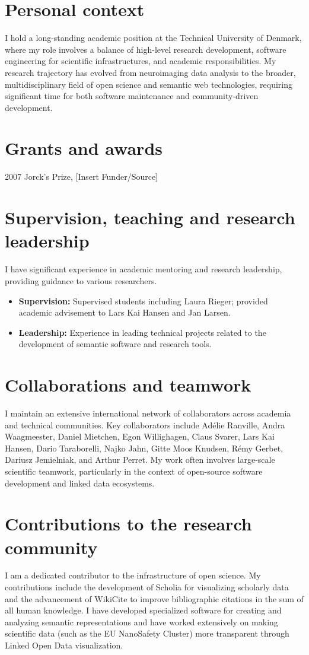 \documentclass[12pt]{article}
\begin{document}
\section*{Personal context}
I hold a long-standing academic position at the Technical University of Denmark, where my role involves a balance of high-level research development, software engineering for scientific infrastructures, and academic responsibilities. My research trajectory has evolved from neuroimaging data analysis to the broader, multidisciplinary field of open science and semantic web technologies, requiring significant time for both software maintenance and community-driven development.

\section*{Grants and awards}
2007 \quad Jorck's Prize, [Insert Funder/Source]

\section*{Supervision, teaching and research leadership}
I have significant experience in academic mentoring and research leadership, providing guidance to various researchers. 
\begin{itemize}
    \item \textbf{Supervision:} Supervised students including Laura Rieger; provided academic advisement to Lars Kai Hansen and Jan Larsen.
    \item \textbf{Leadership:} Experience in leading technical projects related to the development of semantic software and research tools.
\end{itemize}

\section*{Collaborations and teamwork}
I maintain an extensive international network of collaborators across academia and technical communities. Key collaborators include Adélie Ranville, Andra Waagmeester, Daniel Mietchen, Egon Willighagen, Claus Svarer, Lars Kai Hansen, Dario Taraborelli, Najko Jahn, Gitte Moos Knudsen, Rémy Gerbet, Dariusz Jemielniak, and Arthur Perret. My work often involves large-scale scientific teamwork, particularly in the context of open-source software development and linked data ecosystems.

\section*{Contributions to the research community}
I am a dedicated contributor to the infrastructure of open science. My contributions include the development of Scholia for visualizing scholarly data and the advancement of WikiCite to improve bibliographic citations in the sum of all human knowledge. I have developed specialized software for creating and analyzing semantic representations and have worked extensively on making scientific data (such as the EU NanoSafety Cluster) more transparent through Linked Open Data visualization.
\end{document}

